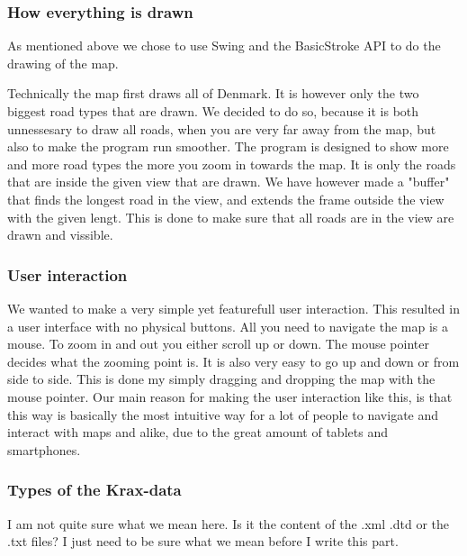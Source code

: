 \documentclass[a4paper,11pt]{article}
\begin{document}
\subsubsection{How everything is drawn} %
\label{subsub:How everything is drawn}
As mentioned above we chose to use Swing and the BasicStroke API to do the drawing of the map. 

Technically the map first draws all of Denmark. It is however only the two biggest road types that are drawn. We decided to do so, because it is both unnessesary to draw all roads, when you are very far away from the map, but also to make the program run smoother. The program is designed to show more and more road types the more you zoom in towards the map. It is only the roads that are inside the given view that are drawn. We have however made a "buffer" that finds the longest road in the view, and extends the frame outside the view with the given lengt. This is done to make sure that all roads are in the view are drawn and vissible.

\subsubsection{User interaction} %
\label{subsub:User interaction}
We wanted to make a very simple yet featurefull user interaction. This resulted in a user interface with no physical buttons. All you need to navigate the map is a mouse. To zoom in and out you either scroll up or down. The mouse pointer decides what the zooming point is. It is also very easy to go up and down or from side to side. This is done my simply dragging and dropping the map with the mouse pointer. Our main reason for making the user interaction like this, is that this way is basically the most intuitive way for a lot of people to navigate and interact with maps and alike, due to the great amount of tablets and smartphones.

\subsubsection{Types of the Krax-data} %
\label{subsub:Types of the Krax-data}
I am not quite sure what we mean here. Is it the content of the .xml .dtd or the .txt files? I just need to be sure what we mean before I write this part.
\end{document}
